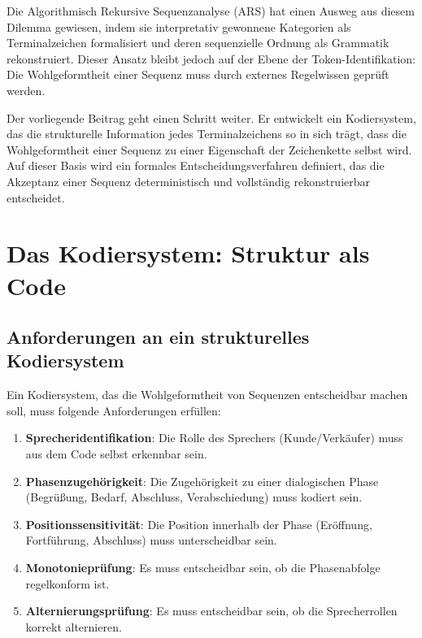\documentclass[
  12pt,
  a4paper,
  oneside,
  titlepage
]{article}
\begin{document}
Die Algorithmisch Rekursive Sequenzanalyse (ARS) hat einen Ausweg aus 
diesem Dilemma gewiesen, indem sie interpretativ gewonnene Kategorien 
als Terminalzeichen formalisiert und deren sequenzielle Ordnung als 
Grammatik rekonstruiert. Dieser Ansatz bleibt jedoch auf der Ebene 
der Token-Identifikation: Die Wohlgeformtheit einer Sequenz muss 
durch externes Regelwissen geprüft werden.

Der vorliegende Beitrag geht einen Schritt weiter. Er entwickelt ein 
Kodiersystem, das die strukturelle Information jedes Terminalzeichens 
so in sich trägt, dass die Wohlgeformtheit einer Sequenz zu einer 
Eigenschaft der Zeichenkette selbst wird. Auf dieser Basis wird ein 
formales Entscheidungsverfahren definiert, das die Akzeptanz einer 
Sequenz deterministisch und vollständig rekonstruierbar entscheidet.

\section{Das Kodiersystem: Struktur als Code}

\subsection{Anforderungen an ein strukturelles Kodiersystem}

Ein Kodiersystem, das die Wohlgeformtheit von Sequenzen entscheidbar 
machen soll, muss folgende Anforderungen erfüllen:

\begin{enumerate}
    \item \textbf{Sprecheridentifikation}: Die Rolle des Sprechers 
    (Kunde/Verkäufer) muss aus dem Code selbst erkennbar sein.
    
    \item \textbf{Phasenzugehörigkeit}: Die Zugehörigkeit zu einer 
    dialogischen Phase (Begrüßung, Bedarf, Abschluss, Verabschiedung) 
    muss kodiert sein.
    
    \item \textbf{Positionssensitivität}: Die Position innerhalb der 
    Phase (Eröffnung, Fortführung, Abschluss) muss unterscheidbar sein.
    
    \item \textbf{Monotonieprüfung}: Es muss entscheidbar sein, ob die 
    Phasenabfolge regelkonform ist.
    
    \item \textbf{Alternierungsprüfung}: Es muss entscheidbar sein, ob 
    die Sprecherrollen korrekt alternieren.
\end{enumerate}
\end{document}
